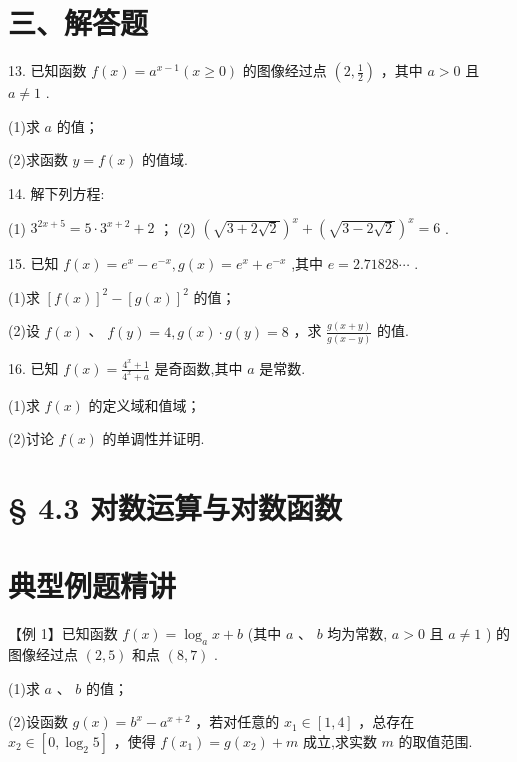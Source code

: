 \section*{三、解答题}

13. 已知函数 $f\left( x\right)  = {a}^{x - 1}\left( {x \geq  0}\right)$ 的图像经过点 $\left( {2,\frac{1}{2}}\right)$ ，其中 $a > 0$ 且 $a \neq  1$ .

(1)求 $a$ 的值；

(2)求函数 $y = f\left( x\right)$ 的值域.

14. 解下列方程:

(1) ${3}^{{2x} + 5} = 5 \cdot  {3}^{x + 2} + 2$ ； (2) ${\left( \sqrt{3 + 2\sqrt{2}}\right) }^{x} + {\left( \sqrt{3 - 2\sqrt{2}}\right) }^{x} = 6$ .

15. 已知 $f\left( x\right)  = {{e}}^{x} - {{e}}^{-x},g\left( x\right)  = {{e}}^{x} + {{e}}^{-x}$ ,其中 ${e} = {2.71828}\cdots$ .

(1)求 ${\left\lbrack  f\left( x\right) \right\rbrack  }^{2} - {\left\lbrack  g\left( x\right) \right\rbrack  }^{2}$ 的值；

(2)设 $f\left( x\right)$ 、 $f\left( y\right)  = 4,g\left( x\right)  \cdot  g\left( y\right)  = 8$ ，求 $\frac{g\left( {x + y}\right) }{g\left( {x - y}\right) }$ 的值.

16. 已知 $f\left( x\right)  = \frac{{4}^{x} + 1}{{4}^{x} + a}$ 是奇函数,其中 $a$ 是常数.

(1)求 $f\left( x\right)$ 的定义域和值域；

(2)讨论 $f\left( x\right)$ 的单调性并证明.

\section*{§ 4.3 对数运算与对数函数}

\section*{典型例题精讲}

【例 1】已知函数 $f\left( x\right)  = {\log }_{a}x + b$ (其中 $a\text{ 、 }b$ 均为常数, $a > 0$ 且 $a \neq  1$ ) 的图像经过点 $\left( {2,5}\right)$ 和点 $\left( {8,7}\right)$ .

(1)求 $a$ 、 $b$ 的值；

(2)设函数 $g\left( x\right)  = {b}^{x} - {a}^{x + 2}$ ，若对任意的 ${x}_{1} \in  \left\lbrack  {1,4}\right\rbrack$ ，总存在 ${x}_{2} \in  \left\lbrack  {0,{\log }_{2}5}\right\rbrack$ ，使得 $f\left( {x}_{1}\right)  = g\left( {x}_{2}\right)  + m$ 成立,求实数 $m$ 的取值范围.

